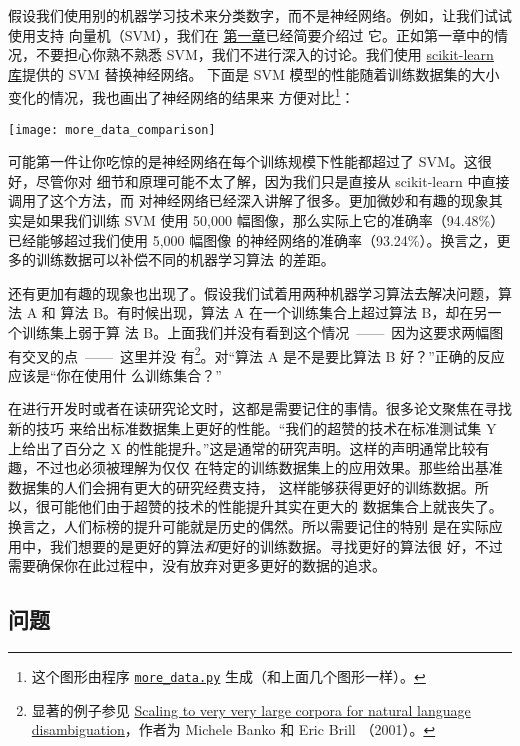 假设我们使用别的机器学习技术来分类数字，而不是神经网络。例如，让我们试试使用支持
向量机（SVM），我们在%
\hyperref[ch:UsingNeuralNetsToRecognizeHandwrittenDigits]{第一章}已经简要介绍过
它。正如第一章中的情况，不要担心你熟不熟悉 SVM，我们不进行深入的讨论。我们使用
\href{http://scikit-learn.org/stable/}{scikit-learn 库}提供的 SVM 替换神经网络。
下面是 SVM 模型的性能随着训练数据集的大小变化的情况，我也画出了神经网络的结果来
方便对比\footnote{这个图形由程序
  \href{https://github.com/mnielsen/neural-networks-and-deep-learning/blob/master/fig/more_data.py}{\lstinline!more_data.py!}
  生成（和上面几个图形一样）。}：
\begin{center}
\texttt{[image: more\_data\_comparison]}
\end{center}

可能第一件让你吃惊的是神经网络在每个训练规模下性能都超过了 SVM。这很好，尽管你对
细节和原理可能不太了解，因为我们只是直接从 scikit-learn 中直接调用了这个方法，而
对神经网络已经深入讲解了很多。更加微妙和有趣的现象其实是如果我们训练 SVM 使用
50,000 幅图像，那么实际上它的准确率（94.48\%）已经能够超过我们使用 5,000 幅图像
的神经网络的准确率（93.24\%）。换言之，更多的训练数据可以补偿不同的机器学习算法
的差距。

还有更加有趣的现象也出现了。假设我们试着用两种机器学习算法去解决问题，算法 A 和
算法 B。有时候出现，算法 A 在一个训练集合上超过算法 B，却在另一个训练集上弱于算
法 B。上面我们并没有看到这个情况~——~因为这要求两幅图有交叉的点~——~这里并没
有\footnote{显著的例子参见
  \href{http://dx.doi.org/10.3115/1073012.1073017}{Scaling to very very large
    corpora for natural language disambiguation}，作者为 Michele Banko 和 Eric
  Brill （2001）。}。对“算法 A 是不是要比算法 B 好？”正确的反应应该是“你在使用什
么训练集合？”

在进行开发时或者在读研究论文时，这都是需要记住的事情。很多论文聚焦在寻找新的技巧
来给出标准数据集上更好的性能。“我们的超赞的技术在标准测试集 Y 上给出了百分之 X
的性能提升。”这是通常的研究声明。这样的声明通常比较有趣，不过也必须被理解为仅仅
在特定的训练数据集上的应用效果。那些给出基准数据集的人们会拥有更大的研究经费支持，
这样能够获得更好的训练数据。所以，很可能他们由于超赞的技术的性能提升其实在更大的
数据集合上就丧失了。换言之，人们标榜的提升可能就是历史的偶然。所以需要记住的特别
是在实际应用中，我们想要的是更好的算法\emph{和}更好的训练数据。寻找更好的算法很
好，不过需要确保你在此过程中，没有放弃对更多更好的数据的追求。

\subsection*{问题}

